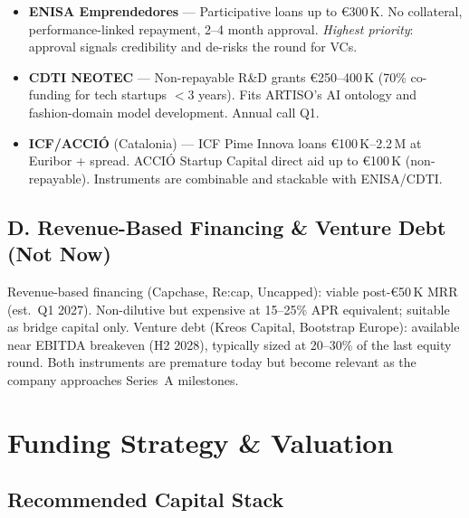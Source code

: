 \documentclass[11pt,a4paper]{article}
\begin{document}
\begin{itemize}
\item \textbf{ENISA Emprendedores} --- Participative loans up to \euro{}300\,K. No collateral, performance-linked repayment, 2--4 month approval. \textit{Highest priority}: approval signals credibility and de-risks the round for VCs.
\item \textbf{CDTI NEOTEC} --- Non-repayable R\&D grants \euro{}250--400\,K (70\% co-funding for tech startups $<$3 years). Fits ARTISO's AI ontology and fashion-domain model development. Annual call Q1.
\item \textbf{ICF/ACCI\'O} (Catalonia) --- ICF Pime Innova loans \euro{}100\,K--2.2\,M at Euribor + spread. ACCI\'O Startup Capital direct aid up to \euro{}100\,K (non-repayable). Instruments are combinable and stackable with ENISA/CDTI.
\end{itemize}

\subsection{D. Revenue-Based Financing \& Venture Debt (Not Now)}

Revenue-based financing (Capchase, Re:cap, Uncapped): viable post-\euro{}50\,K MRR (est.\ Q1 2027). Non-dilutive but expensive at 15--25\% APR equivalent; suitable as bridge capital only. Venture debt (Kreos Capital, Bootstrap Europe): available near EBITDA breakeven (H2 2028), typically sized at 20--30\% of the last equity round. Both instruments are premature today but become relevant as the company approaches Series~A milestones.

\section{Funding Strategy \& Valuation}

\subsection{Recommended Capital Stack}
\end{document}
